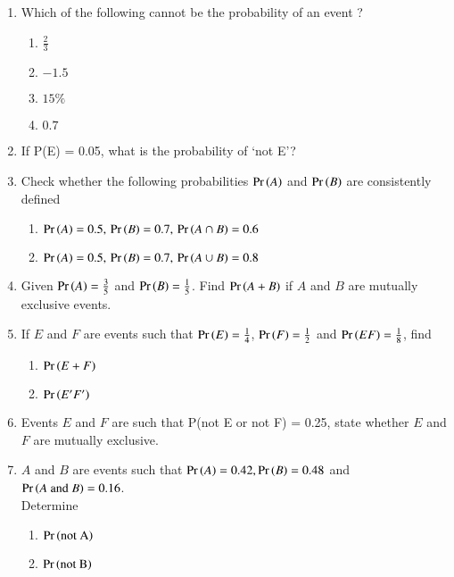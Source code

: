 \begin{enumerate}[label=\thesubsection.\arabic*,ref=\thesubsection.\theenumi]
	\item Which of the following cannot be the probability of an event ? 
\begin{enumerate}
\item $\frac{2}{3}$ 
\item $-1.5$ 
\item $15\%$ 
\item $0.7$ 
\end{enumerate}
\solution

\item If P(E) = 0.05, what is the probability of ‘not E’?\\
\solution

\item Check whether the following probabilities $\Pr\left(A\right)$ and $\Pr\left(B\right)$ are consistently defined
\begin{enumerate}
\item $\Pr\left(A\right) = 0.5,\, \Pr\left(B\right) = 0.7,\, \Pr\left(A \cap B\right) = 0.6$
\item $\Pr\left(A\right) = 0.5,\, \Pr\left(B\right) = 0.7,\, \Pr\left(A \cup B\right) = 0.8$
\end{enumerate}
\solution

\item Given $\Pr\left(A\right)=\frac{3}{5}$ and $\Pr\left(B\right)=\frac{1}{5}$. Find $\Pr\left(A+B\right)$ if $A$ and $B$ are mutually exclusive events.\\
\solution

\item If $E$ and $F$ are events such that $\Pr\left(E\right)=\frac{1}{4}$, $\Pr\left(F\right)= \frac{1}{2}$ and $\Pr\left(EF\right) =\frac{1}{8}$, find
\begin{enumerate}
\item $\Pr\left(E + F\right)$
\item $\Pr\left(E^\prime F^\prime\right)$
\end{enumerate}
\solution

\item Events $E$ and $F$ are such that P(not E or not F) = 0.25, state whether $E$ and $F$ are mutually exclusive.\\
\solution

	\item $A$ and $B$ are events such that $\Pr\left(A\right)=0.42, \Pr\left(B\right)=0.48$ and $\Pr\left(A \text{ and } B\right)=0.16$. \\
Determine 
\begin{enumerate}
\item $\Pr\left(\text{not A}\right)$ 
\item $\Pr\left(\text{not B}\right)$  

\end{enumerate}
\end{enumerate}
